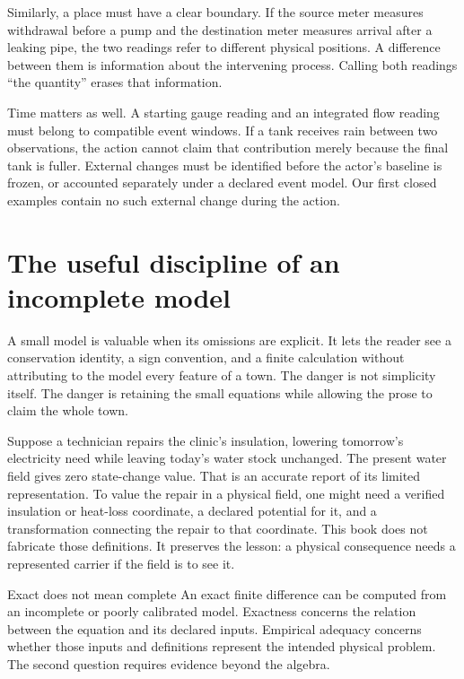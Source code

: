Similarly, a place must have a clear boundary. If the source meter measures withdrawal before a pump and the destination meter measures arrival after a leaking pipe, the two readings refer to different physical positions. A difference between them is information about the intervening process. Calling both readings ``the quantity'' erases that information.

Time matters as well. A starting gauge reading and an integrated flow reading must belong to compatible event windows. If a tank receives rain between two observations, the action cannot claim that contribution merely because the final tank is fuller. External changes must be identified before the actor's baseline is frozen, or accounted separately under a declared event model. Our first closed examples contain no such external change during the action.

\section{The useful discipline of an incomplete model}
A small model is valuable when its omissions are explicit. It lets the reader see a conservation identity, a sign convention, and a finite calculation without attributing to the model every feature of a town. The danger is not simplicity itself. The danger is retaining the small equations while allowing the prose to claim the whole town.

Suppose a technician repairs the clinic's insulation, lowering tomorrow's electricity need while leaving today's water stock unchanged. The present water field gives zero state-change value. That is an accurate report of its limited representation. To value the repair in a physical field, one might need a verified insulation or heat-loss coordinate, a declared potential for it, and a transformation connecting the repair to that coordinate. This book does not fabricate those definitions. It preserves the lesson: a physical consequence needs a represented carrier if the field is to see it.

\begin{cautionbox}{Exact does not mean complete}
An exact finite difference can be computed from an incomplete or poorly calibrated model. Exactness concerns the relation between the equation and its declared inputs. Empirical adequacy concerns whether those inputs and definitions represent the intended physical problem. The second question requires evidence beyond the algebra.
\end{cautionbox}

